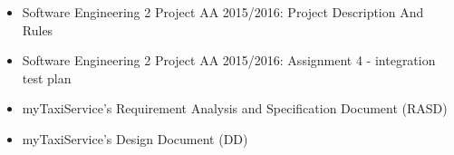 \begin{itemize}
	\item Software Engineering 2 Project AA 2015/2016: Project Description And Rules
	\item Software Engineering 2 Project AA 2015/2016: Assignment 4 - integration test plan
	\item myTaxiService's Requirement Analysis and Specification Document (RASD)
	\item myTaxiService's Design Document (DD)
\end{itemize}